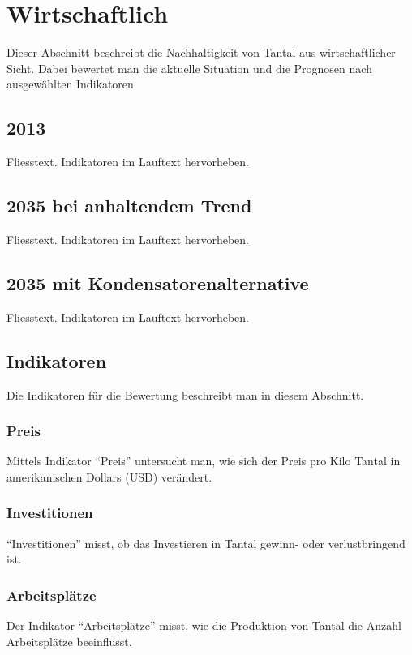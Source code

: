 
\section{Wirtschaftlich}\label{sec:conflict}
Dieser Abschnitt beschreibt die Nachhaltigkeit von Tantal aus wirtschaftlicher
Sicht. Dabei bewertet man die aktuelle Situation und die Prognosen nach
ausgewählten Indikatoren.

\subsection{2013}
Fliesstext. Indikatoren im Lauftext hervorheben.


\subsection{2035 bei anhaltendem Trend}
Fliesstext. Indikatoren im Lauftext hervorheben.

\subsection{2035 mit Kondensatorenalternative}
Fliesstext. Indikatoren im Lauftext hervorheben.

\iffalse
\subsection{Indikatoren}
Die Indikatoren für die Bewertung beschreibt man in diesem Abschnitt.

\subsubsection{Preis}
Mittels Indikator ``Preis'' untersucht man, wie sich der Preis pro Kilo Tantal
in amerikanischen Dollars (USD) verändert.

\subsubsection{Investitionen}
``Investitionen'' misst, ob das Investieren in Tantal gewinn- oder
verlustbringend ist.

\subsubsection{Arbeitsplätze}
Der Indikator ``Arbeitsplätze'' misst, wie die Produktion von Tantal die Anzahl
Arbeitsplätze beeinflusst.

